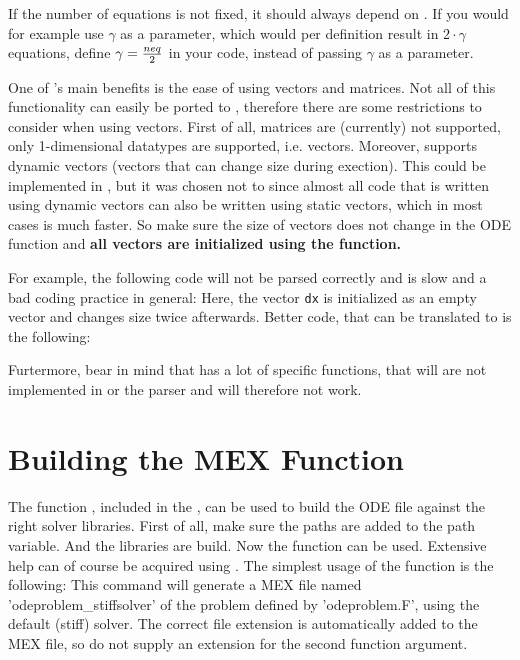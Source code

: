 If the number of equations is not fixed, it should always depend on . If you would for example use $\gamma$ as a parameter, which would per definition result in $2\cdot\gamma$ equations, define $\gamma = {neq \over 2}$ in your code, instead of passing $\gamma$ as a parameter.

One of \MATLAB's main benefits is the ease of using vectors and matrices. Not all of this functionality can easily be ported to \Fortran, therefore there are some restrictions to consider when using vectors. First of all, matrices are (currently) not supported, only 1-dimensional datatypes are supported, i.e. vectors. Moreover, \MATLAB supports dynamic vectors (vectors that can change size during exection). This could be implemented in \Fortran, but it was chosen not to since almost all code that is written using dynamic vectors can also be written using static vectors, which in most cases is much faster. So make sure the size of vectors does not change in the ODE function and \textbf{all vectors are initialized using the  function.}

For example, the following code will not be parsed correctly and is slow and a bad coding practice in general:
Here, the vector \texttt{dx} is initialized as an empty vector and changes size twice afterwards. Better code, that can be translated to \Fortran is the following:

Furtermore, bear in mind that \MATLAB has a lot of specific functions, that will are not implemented in \Fortran or the parser and will therefore not work.

\section[Building]{Building the MEX Function}
The \MATLAB function , included in the \PPODESUITE, can be used to build the ODE \Fortran file against the right solver libraries. First of all, make sure the \PPODESUITE paths are added to the \MATLAB path variable.
And the libraries are build.
Now the function  can be used. Extensive help can of course be acquired using . The simplest usage of the function is the following:
This command will generate a MEX file named 'odeproblem\_stiffsolver' of the problem defined by 'odeproblem.F', using the default (stiff) solver. The correct file extension is automatically added to the MEX file, so do not supply an extension for the second function argument.

